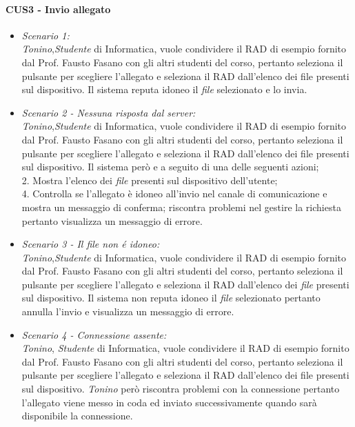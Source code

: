 \paragraph{CUS3 - Invio allegato\\}
\begin{itemize}
	
	\item \textit{Scenario 1:\\}
	\textit{Tonino},\textit{Studente} di Informatica, vuole condividere il RAD di esempio fornito dal Prof. Fausto Fasano con gli altri studenti del corso, pertanto seleziona il pulsante per scegliere l’allegato e seleziona il RAD dall’elenco dei file presenti sul dispositivo. Il sistema reputa idoneo il \textit{file} selezionato e lo invia.\\
	
	\item \textit{Scenario 2 - Nessuna risposta dal server:\\}
	\textit{Tonino},\textit{Studente} di Informatica, vuole condividere il RAD di esempio fornito dal Prof. Fausto Fasano con gli altri studenti del corso, pertanto seleziona il pulsante per scegliere l’allegato e seleziona il RAD dall’elenco dei file presenti sul dispositivo. Il sistema però e a seguito di una delle seguenti azioni;\\
	2. Mostra l’elenco dei \textit{file} presenti sul dispositivo dell’utente;\\
	4. Controlla se l’allegato è idoneo all’invio nel canale di comunicazione e mostra un messaggio di conferma;
	riscontra problemi nel gestire la richiesta pertanto visualizza un messaggio di errore.\\
	
	\item \textit{Scenario 3 - Il file non é idoneo:\\}
	\textit{Tonino},\textit{Studente} di Informatica, vuole condividere il RAD di esempio fornito dal Prof. Fausto Fasano con gli altri studenti del corso, pertanto seleziona il pulsante per scegliere l’allegato e seleziona il RAD dall’elenco dei \textit{file} presenti sul dispositivo. Il sistema non reputa idoneo il \textit{file} selezionato pertanto annulla l’invio e visualizza un messaggio di errore.\\
	
	\item \textit{Scenario 4 - Connessione assente:\\}
	\textit{Tonino}, \textit{Studente} di Informatica, vuole condividere il RAD di esempio fornito dal Prof. Fausto Fasano con gli altri studenti del corso, pertanto seleziona il pulsante per scegliere l’allegato e seleziona il RAD dall’elenco dei file presenti sul dispositivo. \textit{Tonino} però riscontra problemi con la connessione pertanto l’allegato viene messo in coda ed inviato successivamente quando sarà disponibile la connessione.
\end{itemize}

